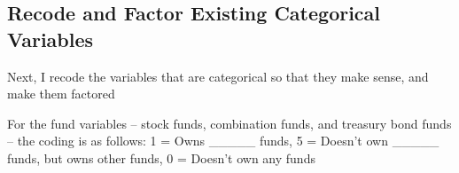 \documentclass[
]{article}
\newenvironment{Shaded}{\begin{snugshade}}{\end{snugshade}}
\newcommand{\KeywordTok}[1]{\textcolor[rgb]{0.13,0.29,0.53}{\textbf{#1}}}
\newcommand{\NormalTok}[1]{#1}
\newcommand{\OperatorTok}[1]{\textcolor[rgb]{0.81,0.36,0.00}{\textbf{#1}}}
\newcommand{\StringTok}[1]{\textcolor[rgb]{0.31,0.60,0.02}{#1}}
\begin{document}
\hypertarget{recode-and-factor-existing-categorical-variables}{%
\subsection{Recode and Factor Existing Categorical
Variables}\label{recode-and-factor-existing-categorical-variables}}

Next, I recode the variables that are categorical so that they make
sense, and make them factored

\begin{Shaded}
\end{Shaded}

For the fund variables -- stock funds, combination funds, and treasury
bond funds -- the coding is as follows: 1 = Owns \_\_\_\_\_ funds, 5 =
Doesn't own \_\_\_\_\_ funds, but owns other funds, 0 = Doesn't own any
funds
\end{document}
